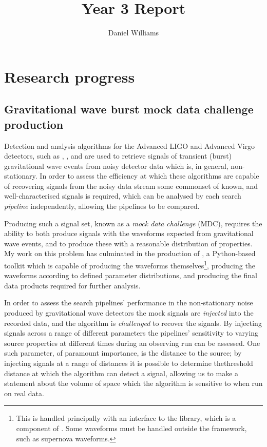 \documentclass{kentigern}
\title{Year 3 Report}
\author{Daniel Williams}
\theoremstyle{definition}
\begin{document}
\maketitle

\chapter{Research progress}
\chapterprecis{}
\section{Gravitational wave burst mock data challenge production}

Detection and analysis algorithms for the Advanced LIGO and Advanced
Virgo detectors, such as \cwb{}\cite{2008CQGra..25k4029K},
\olib{}\cite{2015arXiv151105955L}, and
\bayeswave{}\cite{2015CQGra..32m5012C} are used to retrieve signals
of transient (burst) gravitational wave events from noisy detector
data which is, in general, non-stationary. In order to assess the
efficiency at which these algorithms are capable of recovering signals
from the noisy data stream some commonset of known, and well-characterised
signals is required, which can be analysed by each search
\emph{pipeline} independently, allowing the pipelines to be compared.

Producing such a signal set, known as a \emph{mock data challenge}
(MDC), requires the ability to both produce signals with the waveforms
expected from gravitational wave events, and to produce these with a
reasonable distribution of properties. My work on this problem has
culminated in the production of \minke{}\cite{minkepaper}, a
Python-based toolkit which is capable of producing the waveforms
themselves\footnote{This is handled principally with an interface to
  the \lalsimulation{} library, which is a component of \lalsuite{}. Some
  waveforms must be handled outside the \lalsimulation{} framework, such
  as supernova waveforms.}, producing the waveforms according to
defined parameter distributions, and producing the final data products
required for further analysis.

In order to assess the search pipelines' performance in the
non-stationary noise produced by gravitational wave detectors the mock
signals are \emph{injected} into the recorded data, and the algorithm
is \emph{challenged} to recover the signals. By injecting signals
across a range of different parameters the pipelines' sensitivity to
varying source properties at different times during an observing run
can be assessed. One such parameter, of paramount importance, is the
distance to the source; by injecting signals at a range of distances
it is possible to determine thethreshold distance at which the
algorithm can detect a signal, allowing us to make a statement about
the volume of space which the algorithm is sensitive to when run on
real data.
\end{document}
